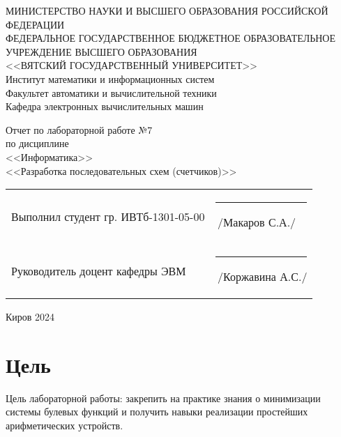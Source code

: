 \documentclass[a4paper,14pt]{extarticle}
\begin{document}
	
	\newpage\thispagestyle{empty}
	\begin{center}
		\MakeUppercase{
			Министерство науки и высшего образования Российской Федерации\\
			Федеральное государственное бюджетное образовательное учреждение высшего образования\\
			<<Вятский Государственный Университет>>\\
		}
		Институт математики и информационных систем\\
		Факультет автоматики и вычислительной техники\\
		Кафедра электронных вычислительных машин
	\end{center}
	\vfill
	
	\begin{center}
		Отчет по лабораторной работе №7\\
		по дисциплине\\
		<<Информатика>>\\
		<<Разработка последовательных схем (счетчиков)>>
	\end{center}
	\vfill
	
	\noindent
	\begin{tabular}{ll}
		Выполнил студент гр. ИВТб-1301-05-00 \hspace{5mm} &
		\rule[-1mm]{25mm}{0.10mm}\,/Макаров С.А./\\
		
		Руководитель доцент кафедры ЭВМ & \rule[-1mm]{25mm}{0.10mm}\,/Коржавина А.С./\\
	\end{tabular}
	
	\vfill
	\begin{center}
		Киров 2024
	\end{center}
	
	\newpage
	\section*{Цель}
	Цель лабораторной работы: закрепить на практике знания о минимизации системы булевых функций и получить навыки реализации простейших арифметических устройств.
	
\end{document}
